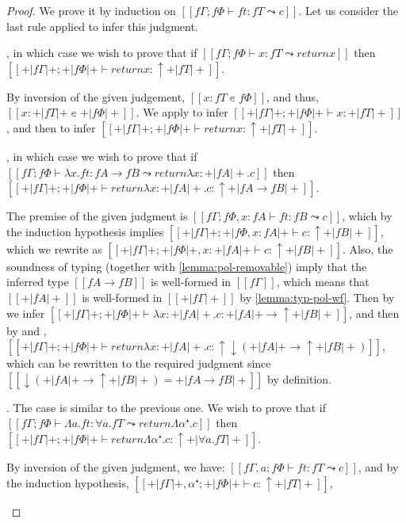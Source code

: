 \lemmaPolarSoundness*
\begin{proof}
  We prove it by induction on $[[fΓ ; fΦ ⊢ ft : fT ⤳ c]]$.
  Let us consider the last rule applied to infer this judgment.
  \begin{caseof}
    \item {},
      in which case
      we wish to prove that if
      $[[ fΓ ; fΦ ⊢ x : fT  ⤳  return x]]$
      then 
      $[[+|fΓ|+ ; +|fΦ|+ ⊢ return x : ↑+|fT|+]]$.

      By inversion of the given judgement, 
      $[[x : fT ∊ fΦ]]$, and thus, 
      $[[x : +|fT|+ ∊ +|fΦ|+]]$.
      We apply 
      to infer $[[+|fΓ|+ ; +|fΦ|+  ⊢ x : +|fT|+]]$, 
      and then 
      to infer $[[+|fΓ|+ ; +|fΦ|+  ⊢ return x : ↑+|fT|+]]$.

    \item {},
      in which case we wish to prove that if
      $[[ fΓ ; fΦ ⊢ λx. ft : fA → fB  ⤳  return {λx : +|fA|+. c}]]$
      then
      $[[+|fΓ|+ ; +|fΦ|+ ⊢ return {λx : +|fA|+. c} : ↑+|fA → fB|+]]$.

      The premise of the given judgment is 
      $[[fΓ; fΦ, x:fA  ⊢ ft : fB  ⤳ c]]$, which by the induction hypothesis
      implies $[[+|fΓ|+ ; +|fΦ, x:fA|+  ⊢ c : ↑+|fB|+]]$,
      which we rewrite as 
      $[[+|fΓ|+ ; +|fΦ|+, x:+|fA|+  ⊢ c : ↑+|fB|+]]$.
      Also, the soundness of \systemf typing (together with \cref{lemma:pol-removable}) 
      imply that the inferred type $[[fA → fB]]$ is well-formed in $[[fΓ]]$,
      which means that $[[+|fA|+]]$ is well-formed in 
      $[[+|fΓ|+]]$ by \cref{lemma:typ-pol-wf}.
      Then by  we infer 
      $[[+|fΓ|+ ; +|fΦ|+  ⊢ λx : +|fA|+. c : +|fA|+ → ↑+|fB|+]]$,
      and then by  and , 
      $[[+|fΓ|+ ; +|fΦ|+  ⊢ return {λx : +|fA|+. c} : ↑↓(+|fA|+ → ↑+|fB|+)]]$, 
      which can be rewritten to the required judgment since
      $[[↓(+|fA|+ → ↑+|fB|+) = +|fA → fB|+]]$ by definition.

    \item {}.
      The case is similar to the previous one.
      We wish to prove that if
      $[[ fΓ ; fΦ ⊢ Λa.ft : ∀a.fT  ⤳  return {Λα⁺.c}]]$
      then
      $[[ +|fΓ|+ ; +|fΦ|+ ⊢ return {Λα⁺.c} : ↑+|∀a.fT|+]]$.

      By inversion of the given judgment, we have:
      $[[fΓ, a ; fΦ ⊢ ft : fT  ⤳ c]]$, and by the induction hypothesis,
      $[[+|fΓ|+, α⁺ ; +|fΦ|+ ⊢ c : ↑+|fT|+]]$,


\end{caseof}
\end{proof}
